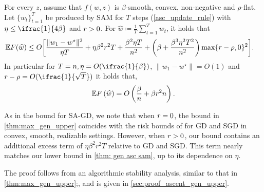 \begin{theorem}
\label{thm:ascent_gen_upper}
For every $z$, assume that $f(w,z)$ is
$\beta$-smooth, convex, non-negative and $\rho$-flat. Let $\{w_t\}_{t=1}^T$ be produced by SAM for $T$ steps
(\cref{asc_update_rule}) with $\eta \leq \ifrac{1}{4\beta}$ and $r >0$. For $\widehat{w} \coloneqq \frac{1}{T}\sum_{t=1}^T w_t$, it
holds that\begin{align*}
    \mathbb E F (\widehat{w}) 
    \leq
    O& \bigg[\frac{\|w_1-w^\star\|^2}{\eta T} + \eta \beta^2 r  ^2  T+ \frac{\beta^2\eta T}{n^2} +\bigg(\beta+\frac{\beta^3\eta^2 T^2}{n^2}\bigg)\max\{r - \rho, 0\}^2 \bigg]
    .
\end{align*}
In particular for  $T=n, \eta=O(\ifrac{1}{\beta})$, $\|w_1-w^\star\|=O(1)$ and $\rad-\rho=O(\ifrac{1}{\sqrt{T}})$ it holds that,
\begin{align*}
     \mathbb E F \left(\widehat{w}\right) =O\left(\frac{\beta}{n}+ \beta r^2 n \right).
\end{align*}
\end{theorem}

As in the bound for SA-GD, we note that when $r = 0$, the bound in \cref{thm:max_gen_upper} coincides with the risk bounds of \citet{ lei2020fine,nikolakakis2022beyond} for GD and SGD in convex, smooth, realizable settings. However, when $r > 0$, our bound contains an additional excess term of $\eta \beta^2 r^2 T$ relative to GD and SGD. This term nearly matches our lower bound in \cref{thm: gen asc sam}, up to its dependence on $\eta$.


The proof follows from an algorithmic stability analysis, similar to that in
\cref{thm:max_gen_upper};, and is given in \cref{sec:proof_ascent_gen_upper}.

